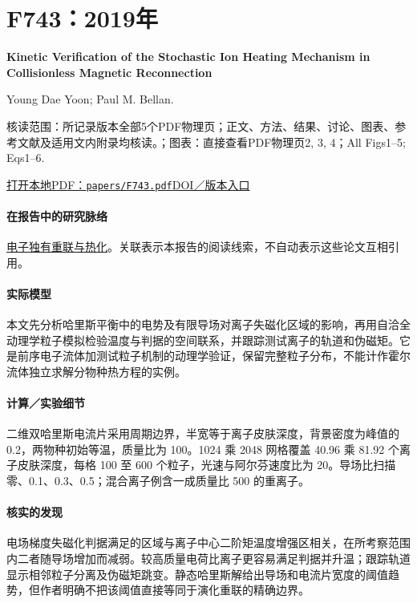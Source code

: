 \section{F743：2019年}\label{paper:F743}

\textbf{Kinetic Verification of the Stochastic Ion Heating Mechanism in Collisionless Magnetic Reconnection}\citep{F743}\

Young Dae Yoon;  Paul M. Bellan.

\textsf{核读范围：}所记录版本全部5个PDF物理页；正文、方法、结果、讨论、图表、参考文献及适用文内附录均核读。；\textsf{图表：}直接查看PDF物理页2, 3, 4；All Figs1–5;  Eqs1–6.

\href{run:papers/F743.pdf}{打开本地PDF：\texttt{papers/F743.pdf}}\quad\href{https://doi.org/10.3847/2041-8213/ab5b0a}{DOI／版本入口}

\paragraph{在报告中的研究脉络}\hyperref[story:energy]{电子独有重联与热化}。关联表示本报告的阅读线索，不自动表示这些论文互相引用。

\paragraph{实际模型}本文先分析哈里斯平衡中的电势及有限导场对离子失磁化区域的影响，再用自洽全动理学粒子模拟检验温度与判据的空间联系，并跟踪测试离子的轨道和伪磁矩。它是前序电子流体加测试粒子机制的动理学验证，保留完整粒子分布，不能计作霍尔流体独立求解分物种热方程的实例。

\paragraph{计算／实验细节}二维双哈里斯电流片采用周期边界，半宽等于离子皮肤深度，背景密度为峰值的 0.2，两物种初始等温，质量比为 100。1024 乘 2048 网格覆盖 40.96 乘 81.92 个离子皮肤深度，每格 100 至 600 个粒子，光速与阿尔芬速度比为 20。导场比扫描零、0.1、0.3、0.5；混合离子例含一成质量比 500 的重离子。

\paragraph{核实的发现}电场梯度失磁化判据满足的区域与离子中心二阶矩温度增强区相关，在所考察范围内二者随导场增加而减弱。较高质量电荷比离子更容易满足判据并升温；跟踪轨道显示相邻粒子分离及伪磁矩跳变。静态哈里斯解给出导场和电流片宽度的阈值趋势，但作者明确不把该阈值直接等同于演化重联的精确边界。

